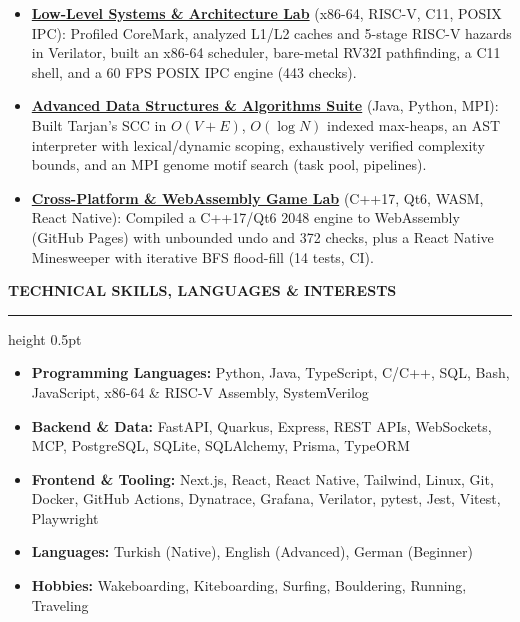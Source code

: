 \documentclass[a4paper]{article}
\newcommand{\sechead}[1]{%
    \vspace{11.0pt}%
    {\fontsize{10.0}{12.0}\textbf{\MakeUppercase{#1}}\par}%
    \vspace{2.4pt}%
    \hrule height 0.5pt%
    \vspace{4.6pt}%
}
\newcommand{\desc}[1]{%
    {\fontsize{8.0}{10.3}\selectfont #1}%
}
\begin{document}
{\raggedright
\begin{itemize}[leftmargin=1.1em, itemsep=1.2pt, parsep=0pt, topsep=1.2pt]
    \item \desc{\textbf{\href{https://github.com/yigitsarpavci/low-level-systems-lab}{Low-Level Systems \& Architecture Lab}} (x86-64, RISC-V, C11, POSIX IPC): Profiled CoreMark, analyzed L1/L2 caches and 5-stage RISC-V hazards in Verilator, built an x86-64 scheduler, bare-metal RV32I pathfinding, a C11 shell, and a 60 FPS POSIX IPC engine (443 checks).}
    \item \desc{\textbf{\href{https://github.com/yigitsarpavci/data-structures-and-algorithms-suite}{Advanced Data Structures \& Algorithms Suite}} (Java, Python, MPI): Built Tarjan's SCC in $O(V+E)$, $O(\log N)$ indexed max-heaps, an AST interpreter with lexical/dynamic scoping, exhaustively verified complexity bounds, and an MPI genome motif search (task pool, pipelines).}
    \item \desc{\textbf{\href{https://github.com/yigitsarpavci/cross-platform-game-lab}{Cross-Platform \& WebAssembly Game Lab}} (C++17, Qt6, WASM, React Native): Compiled a C++17/Qt6 2048 engine to WebAssembly (GitHub Pages) with \mbox{unbounded} undo and 372 checks, plus a React Native Minesweeper with iterative BFS flood-fill (14 tests, CI).}
\end{itemize}
\par}

\sechead{Technical Skills, Languages \& Interests}

\begin{itemize}[leftmargin=1.1em, itemsep=1.2pt, parsep=0pt, topsep=1.2pt]
    \item \desc{\textbf{Programming Languages:} Python, Java, TypeScript, C/C++, SQL, Bash, JavaScript, x86-64 \& RISC-V Assembly, SystemVerilog}
    \item \desc{\textbf{Backend \& Data:} FastAPI, Quarkus, Express, REST APIs, WebSockets, MCP, PostgreSQL, SQLite, SQLAlchemy, Prisma, TypeORM}
    \item \desc{\textbf{Frontend \& Tooling:} Next.js, React, React Native, Tailwind, Linux, Git, Docker, GitHub Actions, Dynatrace, Grafana, Verilator, pytest, Jest, Vitest, Playwright}
    \item \desc{\textbf{Languages:} Turkish (Native), English (Advanced), German (Beginner)}
    \item \desc{\textbf{Hobbies:} Wakeboarding, Kiteboarding, Surfing, Bouldering, Running, Traveling}
\end{itemize}
\end{document}
